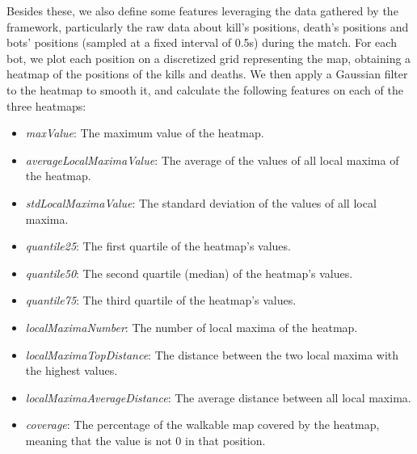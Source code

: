 \documentclass{Configuration_Files/PoliMi3i_thesis}
\begin{document}
Besides these, we also define some features leveraging the data gathered by the framework, particularly the raw data about kill's positions, death's positions and bots' positions (sampled at a fixed interval of 0.5s) during the match. For each bot, we plot each position on a discretized grid representing the map, obtaining a heatmap of the positions of the kills and deaths. We then apply a Gaussian filter to the heatmap to smooth it, and calculate the following features on each of the three heatmaps:

\begin{itemize}
    \item \textit{maxValue}: The maximum value of the heatmap.
    \item \textit{averageLocalMaximaValue}: The average of the values of all local maxima of the heatmap.
    \item \textit{stdLocalMaximaValue}: The standard deviation of the values of all local maxima.
    \item \textit{quantile25}: The first quartile of the heatmap's values.
    \item \textit{quantile50}: The second quartile (median) of the heatmap's values.
    \item \textit{quantile75}: The third quartile of the heatmap's values.
    \item \textit{localMaximaNumber}: The number of local maxima of the heatmap.
    \item \textit{localMaximaTopDistance}: The distance between the two local maxima with the highest values.
    \item \textit{localMaximaAverageDistance}: The average distance between all local maxima.
    \item \textit{coverage}: The percentage of the walkable map covered by the heatmap, meaning that the value is not 0 in that position.
\end{itemize}
\end{document}
